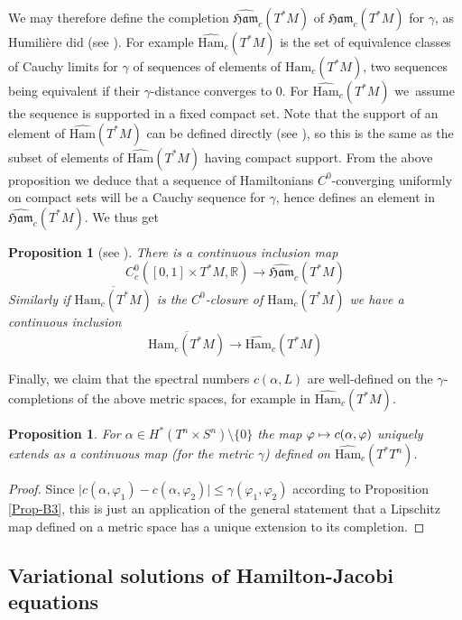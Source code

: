 \documentclass[JEP,XML,SOM,NoFloatCountersInSection,Unicode,published]{cedram}
\newcommand\mto{\mathchoice{\longmapsto}{\mapsto}{\mapsto}{\mapsto}}
\numberwithin{equation}{section}
\newcommand {\Ham}{{\mathfrak {Ham}}}
\newcommand {\DHam}{\mathrm{Ham}}
\newcommand{\gclDHam}[1]{\widehat{\DHam}(#1)}
\newcommand{\gclHamc}[1]{\widehat{\Ham}_c(#1)}
\newcommand{\gclDHamc}[1]{\widehat{\DHam}_c(#1)}
\theoremstyle{plain}
\newtheorem{proposition}[theorem]{Proposition}
\theoremstyle{definition}
\theoremstyle{remark}
\begin{document}
We may therefore define the
completion $\gclHamc{T^{*}M}$ of ${\Ham}_{c}(T^{*}M)$ for $\gamma$, as Humilière did (see \cite[\S4, p.\,388]{Humiliere}). For example $\gclDHamc{T^{*}M}$ is the set of equivalence classes of Cauchy limits for $\gamma$ of sequences of elements of $\DHam_c (T^*M)$, two sequences being equivalent if their $\gamma$-distance converges to $0$. For $\gclDHamc{T^{*}M}$ we~assume the sequence is supported in a fixed compact set. Note that the support of an element of $\gclDHam{T^{*}M}$ can be defined directly (see \cite{Humiliere}), so this is the same as the subset of elements of $\gclDHam{T^{*}M}$ having compact support.
From the above proposition we deduce that a sequence of Hamiltonians $C^{0}$-converging uniformly on compact sets
will be a Cauchy sequence for $\gamma$, hence defines an
element in $\gclHamc{T^{*}M}$. We thus get

\begin{proposition}[see {\cite[Prop.\,1.3]{Humiliere}}] \label{Prop-3.13}
There is a continuous inclusion map
\[
C_{c}^{0} ([0,1] \times T^{*} M, \mathbb{R}) \to \gclHamc{T^{*}M}
\]
Similarly if $\overline{\DHam_c(T^{*}M)}$ is the $C^{0}$-closure of
${\DHam}_{c}(T^{*}M)$ we have a continuous inclusion
\[
\overline{\DHam_c(T^{*}M)}\to \gclDHamc{T^{*}M}
\]
\end{proposition}

Finally, we claim that the spectral numbers $c(\alpha, L)$ are well-defined on the $\gamma$\nobreakdash-com\-ple\-tions of the above metric spaces, for example in $\gclDHamc{T^{*}M}$.

\begin{proposition} \label{Prop-3.14}
For $\alpha \in H^*(T^n\times S^n)\setminus \{0\}$ the map $\varphi \mto c(\alpha, \varphi)$ uniquely extends as a continuous map (for the metric $\gamma$) defined on $\gclDHamc{T^{*}T^{n}}$.
\end{proposition}
\begin{proof}
Since $\vert c(\alpha,\varphi_1) - c(\alpha, \varphi_2) \vert \leq \gamma(\varphi_1, \varphi_2)$ according to Proposition \ref{Prop-B3}, this is just an application of the general statement that a Lipschitz map defined on a metric space has a unique extension to its completion.
\end{proof}

\subsection{Variational solutions of Hamilton-Jacobi equations}\label{Sect-3.2}
\end{document}
